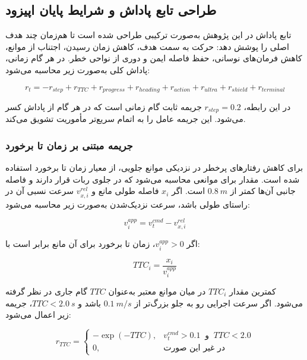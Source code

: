 \subsection{طراحی تابع پاداش و شرایط پایان اپیزود}
\label{subsec:reward_design_final}

تابع پاداش در این پژوهش به‌صورت ترکیبی طراحی شده است تا هم‌زمان چند هدف اصلی را پوشش دهد: حرکت به سمت هدف، کاهش زمان رسیدن، اجتناب از موانع، کاهش فرمان‌های نوسانی، حفظ فاصله ایمن و دوری از نواحی خطر. در هر گام زمانی، پاداش کلی به‌صورت زیر محاسبه می‌شود:

\begin{equation}
	r_t =
	-r_{step}
	+r_{TTC}
	+r_{progress}
	+r_{heading}
	+r_{action}
	+r_{ultra}
	+r_{shield}
	+r_{terminal}
	\label{eq:total_reward_final}
\end{equation}

در این رابطه، \(r_{step}=0.2\) جریمه ثابت گام زمانی است که در هر گام از پاداش کسر می‌شود. این جریمه عامل را به اتمام سریع‌تر مأموریت تشویق می‌کند.

\subsubsection{جریمه مبتنی بر زمان تا برخورد}
\label{subsubsec:ttc_reward_final}

برای کاهش رفتارهای پرخطر در نزدیکی موانع جلویی، از معیار زمان تا برخورد%
 استفاده شده است. مقدار  برای موانعی محاسبه می‌شود که در جلوی ربات قرار دارند و فاصله جانبی آن‌ها کمتر از \(0.8~m\) است. اگر \(x_i\) فاصله طولی مانع و \(v^{rel}_{x,i}\) سرعت نسبی آن در راستای طولی باشد، سرعت نزدیک‌شدن به‌صورت زیر محاسبه می‌شود:

\begin{equation}
	v^{app}_i = v^{cmd}_t - v^{rel}_{x,i}
	\label{eq:approach_speed_final}
\end{equation}

اگر \(v^{app}_i>0\)، زمان تا برخورد برای آن مانع برابر است با:

\begin{equation}
	TTC_i = \frac{x_i}{v^{app}_i}
	\label{eq:ttc_single_final}
\end{equation}

کمترین مقدار \(TTC_i\) در میان موانع معتبر به‌عنوان \(TTC\) گام جاری در نظر گرفته می‌شود. اگر سرعت اجرایی رو به جلو بزرگ‌تر از \(0.1~m/s\) باشد و \(TTC<2.0~s\)، جریمه زیر اعمال می‌شود:

\begin{equation}
	r_{TTC}=
	\begin{cases}
		-\exp(-TTC), & v^{cmd}_t>0.1 \;\; \text{و} \;\; TTC<2.0\\
		0, & \text{در غیر این صورت}
	\end{cases}
	\label{eq:ttc_reward_term_final}
\end{equation}

